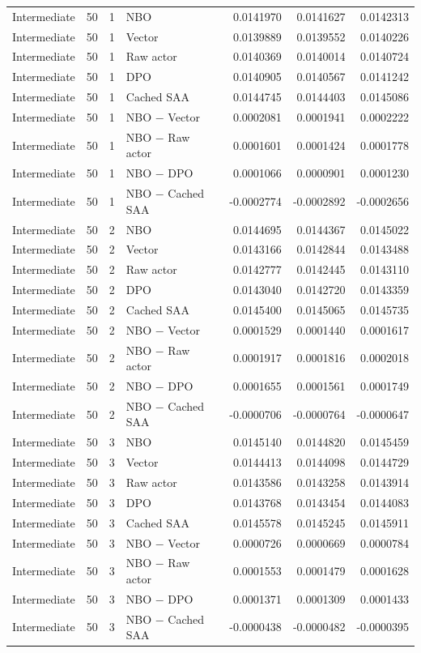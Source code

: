 \begin{longtable}{llrlrrr}
Intermediate & 50 & 1 & NBO & 0.0141970 & 0.0141627 & 0.0142313 \\
Intermediate & 50 & 1 & Vector & 0.0139889 & 0.0139552 & 0.0140226 \\
Intermediate & 50 & 1 & Raw actor & 0.0140369 & 0.0140014 & 0.0140724 \\
Intermediate & 50 & 1 & DPO & 0.0140905 & 0.0140567 & 0.0141242 \\
Intermediate & 50 & 1 & Cached SAA & 0.0144745 & 0.0144403 & 0.0145086 \\
Intermediate & 50 & 1 & NBO $-$ Vector & 0.0002081 & 0.0001941 & 0.0002222 \\
Intermediate & 50 & 1 & NBO $-$ Raw actor & 0.0001601 & 0.0001424 & 0.0001778 \\
Intermediate & 50 & 1 & NBO $-$ DPO & 0.0001066 & 0.0000901 & 0.0001230 \\
Intermediate & 50 & 1 & NBO $-$ Cached SAA & -0.0002774 & -0.0002892 & -0.0002656 \\
Intermediate & 50 & 2 & NBO & 0.0144695 & 0.0144367 & 0.0145022 \\
Intermediate & 50 & 2 & Vector & 0.0143166 & 0.0142844 & 0.0143488 \\
Intermediate & 50 & 2 & Raw actor & 0.0142777 & 0.0142445 & 0.0143110 \\
Intermediate & 50 & 2 & DPO & 0.0143040 & 0.0142720 & 0.0143359 \\
Intermediate & 50 & 2 & Cached SAA & 0.0145400 & 0.0145065 & 0.0145735 \\
Intermediate & 50 & 2 & NBO $-$ Vector & 0.0001529 & 0.0001440 & 0.0001617 \\
Intermediate & 50 & 2 & NBO $-$ Raw actor & 0.0001917 & 0.0001816 & 0.0002018 \\
Intermediate & 50 & 2 & NBO $-$ DPO & 0.0001655 & 0.0001561 & 0.0001749 \\
Intermediate & 50 & 2 & NBO $-$ Cached SAA & -0.0000706 & -0.0000764 & -0.0000647 \\
Intermediate & 50 & 3 & NBO & 0.0145140 & 0.0144820 & 0.0145459 \\
Intermediate & 50 & 3 & Vector & 0.0144413 & 0.0144098 & 0.0144729 \\
Intermediate & 50 & 3 & Raw actor & 0.0143586 & 0.0143258 & 0.0143914 \\
Intermediate & 50 & 3 & DPO & 0.0143768 & 0.0143454 & 0.0144083 \\
Intermediate & 50 & 3 & Cached SAA & 0.0145578 & 0.0145245 & 0.0145911 \\
Intermediate & 50 & 3 & NBO $-$ Vector & 0.0000726 & 0.0000669 & 0.0000784 \\
Intermediate & 50 & 3 & NBO $-$ Raw actor & 0.0001553 & 0.0001479 & 0.0001628 \\
Intermediate & 50 & 3 & NBO $-$ DPO & 0.0001371 & 0.0001309 & 0.0001433 \\
Intermediate & 50 & 3 & NBO $-$ Cached SAA & -0.0000438 & -0.0000482 & -0.0000395 \\
\bottomrule
\end{longtable}
